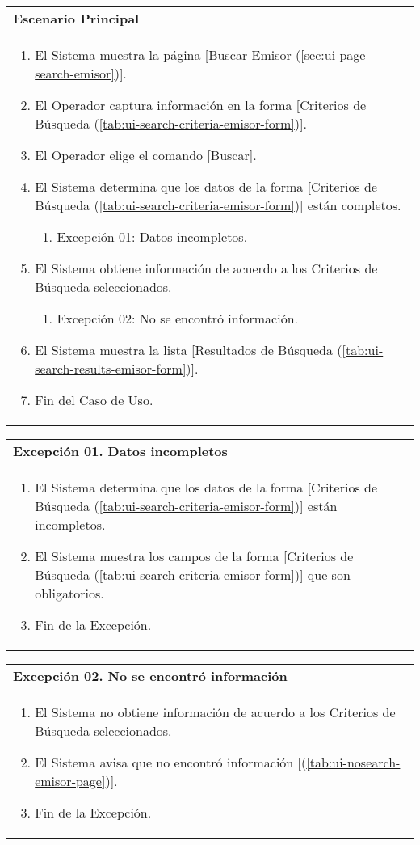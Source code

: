 	\begin{tabular}{ p{15.5cm} }
		\textbf{Escenario Principal} \\
		\begin{enumerate}
			\item El Sistema muestra la p\'agina [Buscar Emisor (\ref{sec:ui-page-search-emisor})].
			\item El Operador captura informaci\'on en la forma [Criterios de B\'usqueda (\ref{tab:ui-search-criteria-emisor-form})].
			\item El Operador elige el comando [Buscar].
			\item El Sistema determina que los datos de la forma [Criterios de B\'usqueda (\ref{tab:ui-search-criteria-emisor-form})] est\'an completos.
				\begin{enumerate}
					\item Excepci\'on 01: Datos incompletos.
				\end{enumerate}
			\item El Sistema obtiene informaci\'on de acuerdo a los Criterios de B\'usqueda seleccionados.
				\begin{enumerate}
					\item Excepci\'on 02: No se encontr\'o informaci\'on.
				\end{enumerate}
			\item El Sistema muestra la lista [Resultados de B\'usqueda (\ref{tab:ui-search-results-emisor-form})].
			\item Fin del Caso de Uso.
		\end{enumerate}
	\end{tabular}
	
	\begin{tabular}{ p{15.5cm} }
		\textbf{Excepci\'on 01. Datos incompletos} \\
		\begin{enumerate}
			\item El Sistema determina que los datos de la forma [Criterios de B\'usqueda (\ref{tab:ui-search-criteria-emisor-form})] est\'an incompletos.
			\item El Sistema muestra los campos de la forma [Criterios de B\'usqueda (\ref{tab:ui-search-criteria-emisor-form})] que son obligatorios.
			\item Fin de la Excepci\'on.
		\end{enumerate}
	\end{tabular}
	
	\begin{tabular}{ p{15.5cm} }
		\textbf{Excepci\'on 02. No se encontr\'o informaci\'on} \\
		\begin{enumerate}
			\item El Sistema no obtiene informaci\'on de acuerdo a los Criterios de B\'usqueda seleccionados.
			\item El Sistema avisa que no encontr\'o informaci\'on [(\ref{tab:ui-nosearch-emisor-page})].
			\item Fin de la Excepci\'on.
		\end{enumerate}
	\end{tabular}
	
